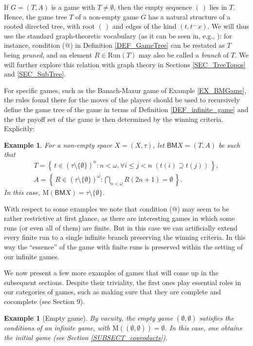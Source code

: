 \documentclass[12pt]{amsart}
\makeatletter
\newcommand*{\rom}[1]{\expandafter\@slowromancap\romannumeral #1@}
\newtheorem{ex}[thm]{Example}
\theoremstyle{definition}
\newcommand{\set}[1]{\left\{\, {#1} \,\right\}}
\newcommand{\seq}[1]{{\left( {#1} \right)}}
\newcommand{\Run}{{\mathrm{Run}}}
\newcommand{\M}{\mathrm{M}}
\newcommand{\BM}{\mathsf{B}\mathsf{M}}
\makeatother
\begin{document}
If $G=(T,A)$ is a game with $T\neq \emptyset$, then the empty sequence $\seq{\,}$ lies in $T$. Hence, the game tree $T$ of a non-empty game $G$ has a natural structure of a rooted directed tree, with root $\seq{\,}$ and edges of the kind $(t,t^\smallfrown x)$. We will thus use the standard graph-theoretic vocabulary (as it can be seen in, e.g., \cite{Pitz2023}): for instance, condition (\rom{2}) in Definition \ref{DEF_GameTree} can be restated as $T$ being \textit{pruned}, and an element $R\in \Run(T)$ may also be called a \textit{branch} of $T$. We will further explore this relation with graph theory in Sections \ref{SEC_TreeTopos} and \ref{SEC_SubTree}.


For specific games, such as the Banach-Mazur game of Example \ref{EX_BMGame}, the rules found there for the moves of the players should be used to recursively define the game tree of the game in terms of Definition \ref{DEF_infinite_game} and the the payoff set of the game is then determined by the winning criteria. Explicitly:


\begin{ex}\label{EX_BMInfGame}
	For a non-empty space $X = (X,\tau)$, let $\BM X = (T,A)$ be such that
	\begin{gather*}
		T = \set{t\in (\tau\setminus\{\emptyset\})^n:n<\omega, \forall i\le j<n\; (t(i)\supseteq t(j))},\\
		A = \set{R\in (\tau\setminus\{\emptyset\})^\omega: \bigcap_{n<\omega}R(2n+1)=\emptyset}.
	\end{gather*}
	In this case, $\M(\BM X) = \tau\setminus\{\emptyset\}$.
\end{ex}


With respect to some examples we note that condition (\rom{2}) may seem to be rather restrictive at first glance, as there are interesting games in which some runs (or even all of them) are finite. But in this case we can artificially extend every finite run to a single infinite branch preserving the winning criteria. In this way the ``essence'' of the game with finite runs is preserved within the setting of our infinite games. 

We now present a few more examples of games that will come up in the subsequent sections. Despite their triviality, the first ones play essential roles in our categories of games, such as making sure that they are complete and cocomplete (see Section 9).


\begin{ex}[Empty game] \label{EX_trivial}
	By vacuity, the empty game $(\emptyset, \emptyset)$ satisfies the conditions of an infinite game, with $\M((\emptyset,\emptyset))=\emptyset$. In this case, one obtains the \emph{initial game} (see {\rm Section \ref{SUBSECT_coproducts}}).
\end{ex}
\end{document}
